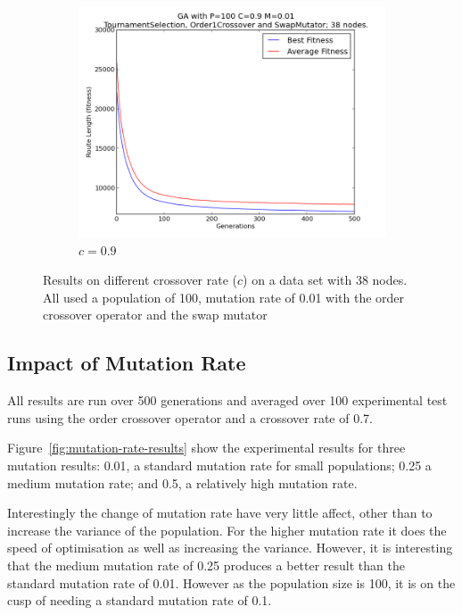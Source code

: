 \documentclass[10pt, a4paper]{article}
\begin{document}
\begin{figure}[h]
\begin{subfigure}[b]{0.67\textwidth}
\includegraphics[width=\textwidth]{img/results/order1crossover/swapmutator/n38p100c09m001}
\caption{$c = 0.9$}
\end{subfigure}
\caption{Results on different crossover rate ($c$) on a data set with 38 nodes.
         All used a population of 100, mutation rate of 0.01 with the order
         crossover operator and the swap mutator}
\label{fig:crossover-rate-results}
\end{figure}


\subsection{Impact of Mutation Rate}

All results are run over 500 generations and averaged over 100 experimental 
test runs using the order crossover operator and a crossover rate of 0.7.

Figure~\ref{fig:mutation-rate-results} show the experimental results for three
mutation results: 0.01, a standard mutation rate for small populations; 0.25 a
medium mutation rate; and 0.5, a relatively high mutation rate.

Interestingly the change of mutation rate have very little affect, other than to
increase the variance of the population. For the higher mutation rate it does
the speed of optimisation as well as increasing the variance. However, it is
interesting that the medium mutation rate of 0.25 produces a better result than
the standard mutation rate of 0.01. However as the population size is 100, it is
on the cusp of needing a standard mutation rate of 0.1.
\end{document}
